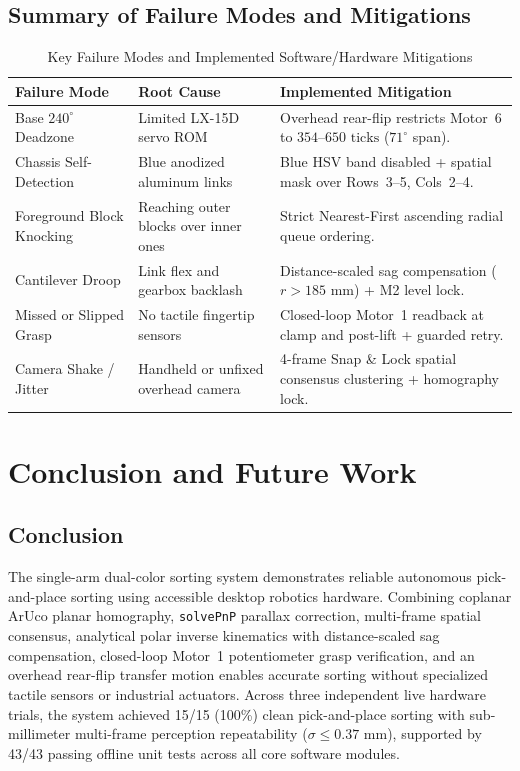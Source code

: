 \documentclass[11pt,a4paper]{article}
\begin{document}
\subsection{Summary of Failure Modes and Mitigations}
\begin{table}[H]
  \centering
  \small
  \caption{Key Failure Modes and Implemented Software/Hardware Mitigations}
  \label{tab:risks}
  \begin{tabularx}{\textwidth}{@{}>{\raggedright\arraybackslash}p{3.5cm} >{\raggedright\arraybackslash}p{3.6cm} X@{}}
    \toprule
    \textbf{Failure Mode} & \textbf{Root Cause} & \textbf{Implemented Mitigation} \\
    \midrule
    Base $240^\circ$ Deadzone & Limited LX-15D servo ROM & Overhead rear-flip restricts Motor~6 to $354\text{--}650\text{ ticks}$ ($71^\circ$ span). \\
    Chassis Self-Detection & Blue anodized aluminum links & Blue HSV band disabled + spatial mask over Rows~3--5, Cols~2--4. \\
    Foreground Block Knocking & Reaching outer blocks over inner ones & Strict Nearest-First ascending radial queue ordering. \\
    Cantilever Droop & Link flex and gearbox backlash & Distance-scaled sag compensation ($r > 185\text{ mm}$) + M2 level lock. \\
    Missed or Slipped Grasp & No tactile fingertip sensors & Closed-loop Motor~1 readback at clamp and post-lift + guarded retry. \\
    Camera Shake / Jitter & Handheld or unfixed overhead camera & 4-frame Snap \& Lock spatial consensus clustering + homography lock. \\
    \bottomrule
  \end{tabularx}
\end{table}

\section{Conclusion and Future Work}

\subsection{Conclusion}
The single-arm dual-color sorting system demonstrates reliable autonomous pick-and-place sorting using accessible desktop robotics hardware. Combining coplanar ArUco planar homography, \texttt{solvePnP} parallax correction, multi-frame spatial consensus, analytical polar inverse kinematics with distance-scaled sag compensation, closed-loop Motor~1 potentiometer grasp verification, and an overhead rear-flip transfer motion enables accurate sorting without specialized tactile sensors or industrial actuators. Across three independent live hardware trials, the system achieved 15/15 (100\%) clean pick-and-place sorting with sub-millimeter multi-frame perception repeatability ($\sigma \le 0.37\text{ mm}$), supported by 43/43 passing offline unit tests across all core software modules.
\end{document}
